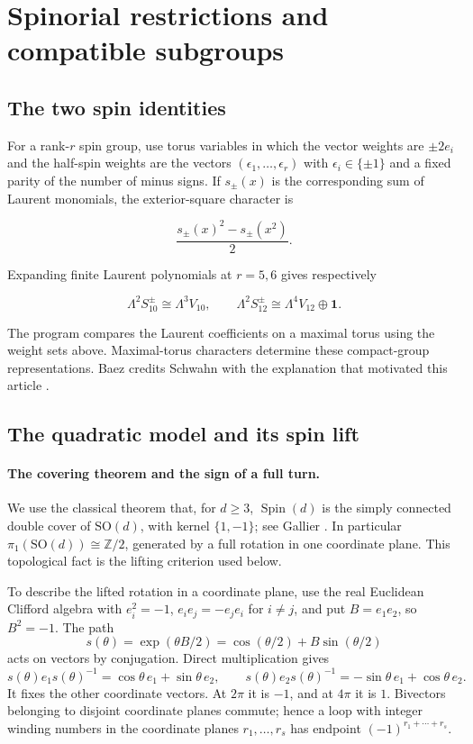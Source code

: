 \documentclass[11pt,a4paper]{article}
\begin{document}
\section{Spinorial restrictions and compatible subgroups}\label{sec:spin}

\subsection{The two spin identities}\label{subsec:D1}

For a rank-\(r\) spin group, use torus variables in which the vector weights are \(\pm2e_i\) and the half-spin weights are the vectors \((\epsilon_1,\ldots,\epsilon_r)\) with \(\epsilon_i\in\{\pm1\}\) and a fixed parity of the number of minus signs. If \(s_\pm(x)\) is the corresponding sum of Laurent monomials, the exterior-square character is

\[
\frac{s_\pm(x)^2-s_\pm(x^2)}2.
\]

Expanding finite Laurent polynomials at \(r=5,6\) gives respectively

\[
\Lambda^2S_{10}^{\pm}\cong\Lambda^3V_{10},\qquad
\Lambda^2S_{12}^{\pm}\cong\Lambda^4V_{12}\oplus\mathbf1.
\]

The program  compares the Laurent coefficients on a maximal torus using the weight sets above. Maximal-torus characters determine these compact-group representations. Baez credits Schwahn with the explanation that motivated this article \citep{Baez2026Coincidences}.

\subsection{The quadratic model and its spin lift}\label{subsec:D2}

\paragraph{The covering theorem and the sign of a full turn.}
We use the classical theorem that, for \(d\geq3\), \(\operatorname{Spin}(d)\) is the simply connected double cover of \(\mathrm{SO}(d)\), with kernel \(\{1,-1\}\); see Gallier \citep[Theorem 1.11 and Section 1.8]{Gallier2014Spin}. In particular \(\pi_1(\mathrm{SO}(d))\cong\mathbb Z/2\), generated by a full rotation in one coordinate plane. This topological fact is the lifting criterion used below.

To describe the lifted rotation in a coordinate plane, use the real Euclidean Clifford algebra with \(e_i^2=-1\), \(e_ie_j=-e_je_i\) for \(i\ne j\), and put \(B=e_1e_2\), so \(B^2=-1\). The path
\[
s(\theta)=\exp(\theta B/2)
=\cos(\theta/2)+B\sin(\theta/2)
\]
acts on vectors by conjugation. Direct multiplication gives
\[
s(\theta)e_1s(\theta)^{-1}
   =\cos\theta\,e_1+\sin\theta\,e_2,\qquad
s(\theta)e_2s(\theta)^{-1}
   =-\sin\theta\,e_1+\cos\theta\,e_2.
\]
It fixes the other coordinate vectors. At \(2\pi\) it is \(-1\), and at \(4\pi\) it is \(1\). Bivectors belonging to disjoint coordinate planes commute; hence a loop with integer winding numbers in the coordinate planes \(r_1,\ldots,r_s\) has endpoint \((-1)^{r_1+\cdots+r_s}\).
\end{document}
